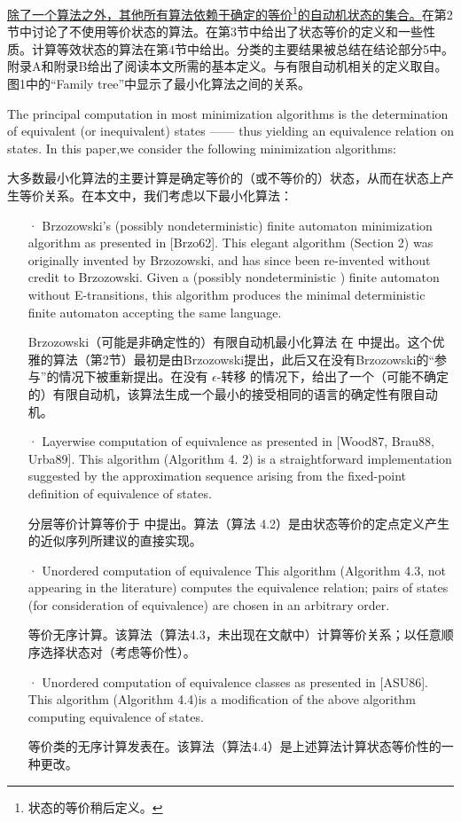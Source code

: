 \uline{除了一个算法之外，其他所有算法依赖于确定的等价}\footnote{状态的等价稍后定义。}\uline{的自动机状态的集合。}在第2节中讨论了不使用等价状态的算法。在第3节中给出了状态等价的定义和一些性质。计算等效状态的算法在第4节中给出。分类的主要结果被总结在结论部分5中。附录A和附录B给出了阅读本文所需的基本定义。与有限自动机相关的定义取自\cite{Wats93}。图1中的“Family tree”中显示了最小化算法之间的关系。

The principal computation in most minimization algorithms is the determination of equivalent (or inequivalent) states —— thus yielding an equivalence relation on states. In this paper,we consider the following minimization algorithms:

大多数最小化算法的主要计算是确定等价的（或不等价的）状态，从而在状态上产生等价关系。在本文中，我们考虑以下最小化算法：

\begin{itemize}
    \item[·] Brzozowski's (possibly nondeterministic) finite automaton minimization algorithm as presented in [Brzo62]. This elegant algorithm (Section 2) was originally invented by Brzozowski, and has since been re-invented without credit to Brzozowski. Given a (possibly nondeterministic ) finite automaton without E-transitions, this algorithm produces the minimal deterministic finite automaton accepting the same language.
    
    Brzozowski（可能是非确定性的）有限自动机最小化算法 在 \cite{Brzo62} 中提出。这个优雅的算法（第2节）最初是由Brzozowski提出，此后又在没有Brzozowski的“参与”的情况下被重新提出。在没有 $\epsilon$-转移 的情况下，给出了一个（可能不确定的）有限自动机，该算法生成一个最小的接受相同的语言的确定性有限自动机。

    \item[·] Layerwise computation of equivalence as presented in [Wood87, \cite{Moor56} Brau88, Urba89]. This algorithm (Algorithm 4. 2) is a straightforward implementation suggested by the approximation sequence arising from the fixed-point definition of equivalence of states. 

    分层等价计算等价于 \cite{Wood87, Moor56, Brau88, Urba89} 中提出。算法（算法 4.2）是由状态等价的定点定义产生的近似序列所建议的直接实现。

    \item[·] Unordered computation of equivalence This algorithm (Algorithm 4.3, not appearing in the literature) computes the equivalence relation; pairs of states (for consideration of equivalence) are chosen in an arbitrary order.

    等价无序计算。该算法（算法4.3，未出现在文献中）计算等价关系；以任意顺序选择状态对（考虑等价性）。

    \item[·] Unordered computation of equivalence classes as presented in [ASU86]. This algorithm (Algorithm 4.4)is a modification of the above algorithm computing equivalence of states.

    等价类的无序计算发表在\cite{ASU86}。该算法（算法4.4）是上述算法计算状态等价性的一种更改。

\end{itemize}

